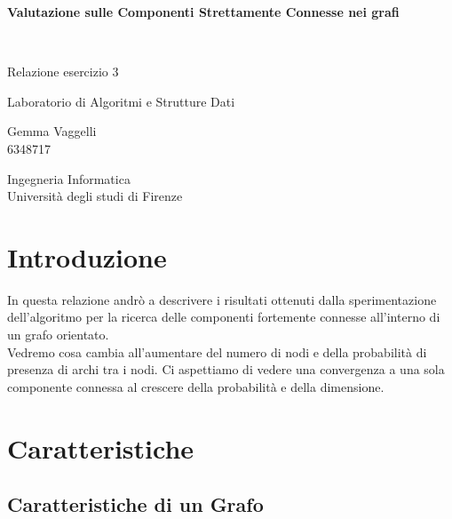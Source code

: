 \documentclass[12pt]{article}
\begin{document}
\begin{titlepage}
   \begin{center}
       \vspace*{1cm}
	   \begin{Huge}
       \textbf{Valutazione sulle Componenti Strettamente Connesse nei grafi}
	   \end{Huge}
       \vspace{1.5cm}
       \\
       \begin{Large}
        Relazione esercizio 3
            
       \vspace{1.5cm}

       Laboratorio di Algoritmi e Strutture Dati
	   \vspace{3cm}
            
       Gemma Vaggelli \\
       6348717
            
       \vfill
     
    
            
       Ingegneria Informatica\\
       Università degli studi di Firenze
       \end{Large}
       
            
   \end{center}
\end{titlepage}

\section{Introduzione}

In questa relazione andrò a descrivere i risultati ottenuti dalla sperimentazione 
dell'algoritmo per la ricerca delle componenti fortemente connesse all'interno di un grafo orientato.\\
Vedremo cosa cambia all'aumentare del numero di nodi e della probabilità di 
presenza di archi tra i nodi.
Ci aspettiamo di vedere una convergenza a una sola componente connessa al crescere della probabilità e della dimensione. \


\section{Caratteristiche}

\subsection{Caratteristiche di un Grafo}
\end{document}
